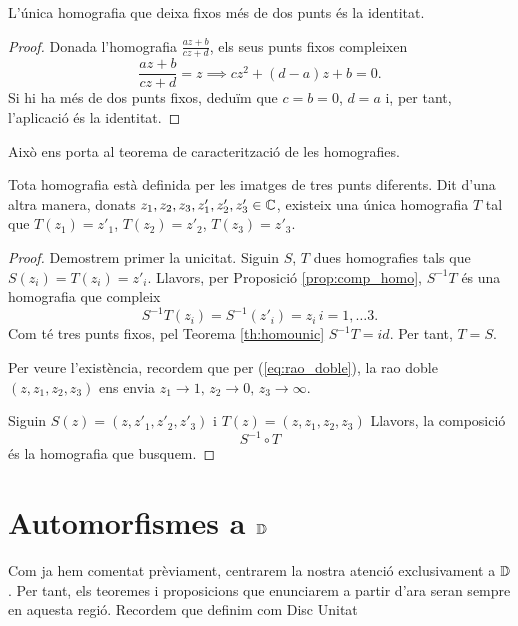 \documentclass[dvipsnames, svgnames, leqno, a4paper, 12pt]{article}
\begin{document}
    \begin{theorem}\label{th:homounic}
        L'única homografia que deixa fixos més de dos punts és la identitat.
    \end{theorem}

    \begin{proof}
        Donada l'homografia $\frac{az+b}{cz+d}$, els seus punts fixos compleixen 
        \begin{displaymath}
            \frac{az+b}{cz+d}=z\implies cz^2+(d-a)z+b=0.
        \end{displaymath}
        Si hi ha més de dos punts fixos, deduïm que $c=b=0$, $d=a$ i, per tant, l'aplicació és la identitat.
    \end{proof}

    Això ens porta al teorema de caracterització de les homografies.

    \begin{theorem}
        Tota homografia està definida per les imatges de tres punts diferents.
        Dit d'una altra manera, donats $z_1,z_2,z_3,z'_1,z'_2,z'_3\in\mathbb{C}$, existeix una única homografia $T$ tal que $T(z_1)=z'_1$, $T(z_2)=z'_2$, $T(z_3)=z'_3$.
    \end{theorem}

    \begin{proof}
        Demostrem primer la unicitat. Siguin $S$, $T$ dues homografies tals que $S(z_i)=T(z_i)=z'_i$. Llavors, per Proposició \ref{prop:comp_homo}, $S^{-1}T$ és una homografia que compleix 
        \begin{displaymath}
            S^{-1}T(z_i)=S^{-1}(z'_i)=z_i\, i=1,\dots3.
        \end{displaymath}
        Com té tres punts fixos, pel Teorema \ref{th:homounic}  $S^{-1}T=id$. Per tant, $T=S$.

        Per veure l'existència, recordem que per (\ref{eq:rao_doble}), la rao doble $(z,z_1,z_2,z_3)$ ens envia $z_1\to1,\, z_2\to0,\, z_3\to\infty$. 

        Siguin $S(z)=(z,z'_1,z'_2,z'_3)$ i $T(z)=(z,z_1,z_2,z_3)$
        Llavors, la composició 
        \begin{displaymath}
            S^{-1}\circ T
        \end{displaymath}
        és la homografia que busquem.
    \end{proof}




\section[Automorfismes al Disc Unitat]{Automorfismes a $\mathbb{D}$}
    Com ja hem comentat prèviament, centrarem la nostra atenció exclusivament a $\mathbb{D}$. Per tant, els teoremes i proposicions que enunciarem a partir d'ara seran sempre en aquesta regió. Recordem que definim com Disc Unitat
    
\end{document}
